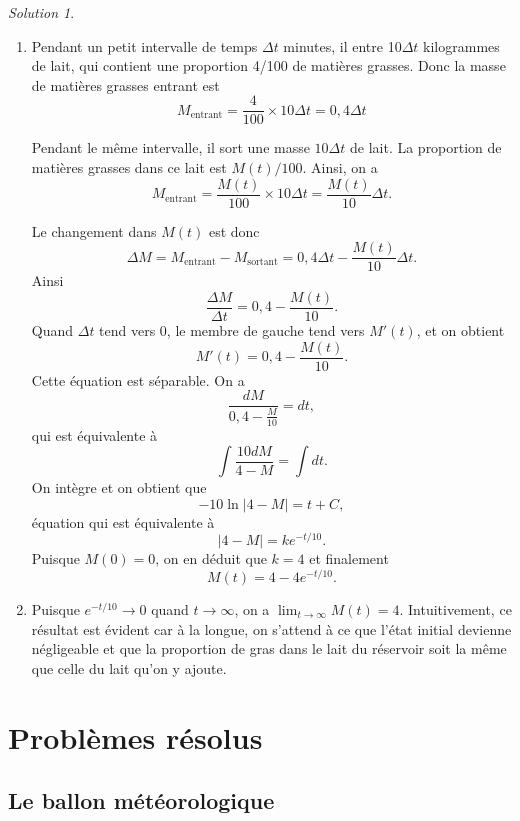 \documentclass[
  12pt,
  letterpaper,
]{book}
\theoremstyle{remark}
\newtheorem*{solution}{Solution}
\begin{document}
\begin{solution}

\begin{enumerate}
\def\labelenumi{\arabic{enumi}.}
\item
  Pendant un petit intervalle de temps \(\Delta t\) minutes, il entre
  10\(\Delta t\) kilogrammes de lait, qui contient une proportion 4/100
  de matières grasses. Donc la masse de matières grasses entrant est
  \[M_{\text{entrant}} = \frac{4}{100} \times 10\Delta t = 0{,}4 \Delta t\]

  Pendant le même intervalle, il sort une masse \(10\Delta t\) de lait.
  La proportion de matières grasses dans ce lait est \(M(t)/100\).
  Ainsi, on a
  \[M_{\text{entrant}} = \frac{M(t)}{100} \times 10\Delta t = \frac{M(t)}{10} \Delta t.\]

  Le changement dans \(M(t)\) est donc
  \[\Delta M = M_{\text{entrant}} - M_{\text{sortant}} = 0{,}4 \Delta t - \frac{M(t)}{10} \Delta t.\]
  Ainsi \[\frac{\Delta M}{\Delta t} = 0{,}4 - \frac{M(t)}{10}.\] Quand
  \(\Delta t\) tend vers 0, le membre de gauche tend vers \(M'(t)\), et
  on obtient \[M'(t) = 0{,}4 - \frac{M(t)}{10}.\] Cette équation est
  séparable. On a \[\frac{dM}{0{,}4 - \frac{M}{10}} = dt,\] qui est
  équivalente à \[\int \frac{10dM}{4 - M} = \int dt.\] On intègre et on
  obtient que \[-10 \ln|4 - M| = t + C,\] équation qui est équivalente à
  \[|4 - M| = ke^{-t/10}.\] Puisque \(M(0) = 0\), on en déduit que
  \(k = 4\) et finalement \[M(t) = 4 - 4e^{-t/10}.\]
\item
  Puisque \(e^{-t/10} \to 0\) quand \(t \to \infty\), on a
  \(\lim_{t \to \infty} M(t) = 4\). Intuitivement, ce résultat est
  évident car à la longue, on s'attend à ce que l'état initial devienne
  négligeable et que la proportion de gras dans le lait du réservoir
  soit la même que celle du lait qu'on y ajoute.
\end{enumerate}

\end{solution}

\part{Problèmes résolus}

\hypertarget{le-ballon-muxe9tuxe9orologique}{%
\chapter{Le ballon
météorologique}\label{le-ballon-muxe9tuxe9orologique}}
\end{document}
